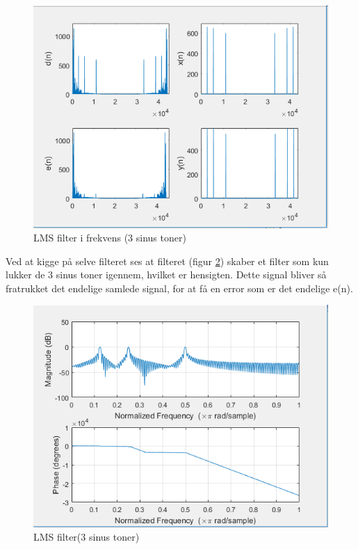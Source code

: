 \begin{figure}[H]
	\centering
	\includegraphics[width = 400pt]{Img/Filter_Freq}
	\caption{LMS filter i frekvens (3 sinus toner)}
	\label{fig:Filter_Freq}
\end{figure}
\newpage
Ved at kigge på selve filteret ses at filteret (figur \ref{fig:Filter}) skaber et filter som kun lukker de 3 sinus toner igennem, hvilket er hensigten. Dette signal bliver så fratrukket det endelige samlede signal, for at få en error som er det endelige e(n). 
\begin{figure}[H]
	\centering
	\includegraphics[width = 400pt]{Img/Filter}
	\caption{LMS filter(3 sinus toner)}
	\label{fig:Filter}
\end{figure}
\newpage

